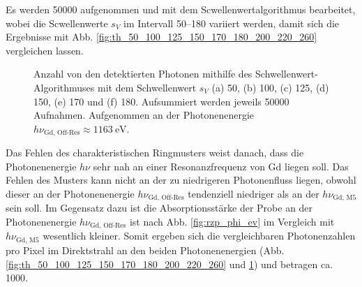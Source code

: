 \noindent
Es werden \SI{50000}{\captures} aufgenommen und mit dem Scwellenwertalgorithmus bearbeitet, wobei die Scwellenwerte $s_V$ im Intervall \SIrange{50}{180}{\adu} variiert werden, damit sich die Ergebnisse mit Abb. \ref{fig:th_50_100_125_150_170_180_200_220_260} vergleichen lassen.
\begin{figure}[H]
    \centering
    
    \caption{Anzahl von den detektierten Photonen mithilfe des Schwellenwert-Algorithmuses mit dem Schwellenwert $s_V$ (a) \SI{50}{\adu}, (b) \SI{100}{\adu}, (c) \SI{125}{\adu}, (d) \SI{150}{\adu}, (e) \SI{170}{\adu} und (f) \SI{180}{\adu}. Aufsummiert werden jeweils \num{50000} Aufnahmen. Aufgenommen an der Photonenenergie $h\nu_\text{Gd, Off-Res} \approx \SI{1163}{\eV}$.}
    \label{fig:th_50_100_125_150_170_180_off_resonance}
\end{figure}
\noindent
Das Fehlen des charakteristischen Ringmusters weist danach, dass die Photonenenergie $h\nu$ sehr nah an einer Resonanzfrequenz von Gd liegen soll. Das Fehlen des Musters kann nicht an der zu niedrigeren Photonenfluss liegen, obwohl dieser an der Photonenenergie $h\nu_{\text{Gd, Off-Res}}$ tendenziell niedriger als an der $h\nu_{\text{Gd, M5}}$ sein soll. Im Gegensatz dazu ist die Absorptionsstärke der Probe an der Photonenenergie $h\nu_{\text{Gd, Off-Res}}$ ist nach Abb. \ref{fig:rzp_phi_ev} im Vergleich mit $h\nu_{\text{Gd, M5}}$ wesentlich kleiner. Somit ergeben sich die vergleichbaren Photonenzahlen pro Pixel im Direktstrahl an den beiden Photonenenergien (Abb. \ref{fig:th_50_100_125_150_170_180_200_220_260} und \ref{fig:th_50_100_125_150_170_180_off_resonance}) und betragen ca. \SI{1000}{\photons}.

